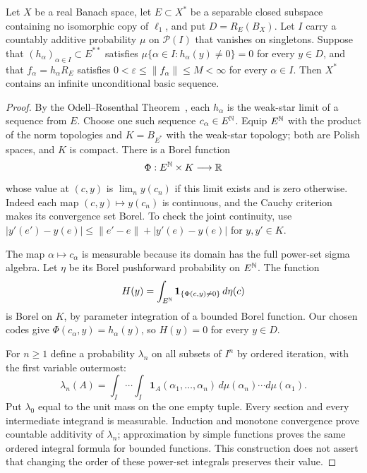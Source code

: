 \begin{lemma}\label{pos:sampling}
Let $X$ be a real Banach space, let $E\subset X^*$ be a separable closed
subspace containing no isomorphic copy of $\ell_1$, and put
$D=R_E(B_X)$.  Let $I$ carry a countably additive probability $\mu$ on
$\mathcal P(I)$ that vanishes on singletons.  Suppose that
$(h_\alpha)_{\alpha\in I}\subset E^{**}$ satisfies
$\mu\{\alpha\in I:h_\alpha(y)\ne0\}=0$ for every $y\in D$, and that
$f_\alpha=h_\alpha R_E$ satisfies
$0<\varepsilon\le\|f_\alpha\|\le M<\infty$ for every $\alpha\in I$.
Then $X^*$ contains an infinite unconditional basic sequence.
\end{lemma}

\begin{proof}
By the Odell--Rosenthal Theorem~\cite{OdellRosenthal1975}, each
$h_\alpha$ is the weak-star limit of a sequence from $E$.  Choose one
such sequence $c_\alpha\in E^{\mathbb N}$.  Equip $E^{\mathbb N}$ with the product of
the norm topologies and $K=B_{E^*}$ with the weak-star topology; both are
Polish spaces, and $K$ is compact.
There is a Borel function
\[
 \Phi:E^{\mathbb N}\times K\longrightarrow\mathbb R
\]
whose value at $(c,y)$ is $\lim_n y(c_n)$ if this limit exists and is
zero otherwise.  Indeed each map $(c,y)\mapsto y(c_n)$ is continuous,
and the Cauchy criterion makes its convergence set Borel.  To check the
joint continuity, use
$|y'(e')-y(e)|\le\|e'-e\|+|y'(e)-y(e)|$ for $y,y'\in K$.

The map $\alpha\mapsto c_\alpha$ is measurable because its domain has
the full power-set sigma algebra.  Let $\eta$ be its Borel pushforward
probability on $E^{\mathbb N}$.  The function
\begin{equation}\label{pos:H}
 H(y)=\int_{E^{\mathbb N}}\mathbf1_{\{\Phi(c,y)\ne0\}}\,d\eta(c)
\end{equation}
is Borel on $K$, by parameter integration of a bounded Borel function.
Our chosen codes give $\Phi(c_\alpha,y)=h_\alpha(y)$, so
$H(y)=0$ for every $y\in D$.

For $n\ge1$ define a probability $\lambda_n$ on all subsets of $I^n$
by ordered iteration, with the first variable outermost:
\[
 \lambda_n(A)=\int_I\cdots\int_I
      \mathbf1_A(\alpha_1,\ldots,\alpha_n)
      \,d\mu(\alpha_n)\cdots d\mu(\alpha_1).
\]
Put $\lambda_0$ equal to the unit mass on the one empty tuple.
Every section and every intermediate integrand is measurable.  Induction
and monotone convergence prove countable additivity of $\lambda_n$;
approximation by simple functions proves the same ordered integral formula
for bounded functions.  This construction does not assert that changing
the order of these power-set integrals preserves their value.


\end{proof}
